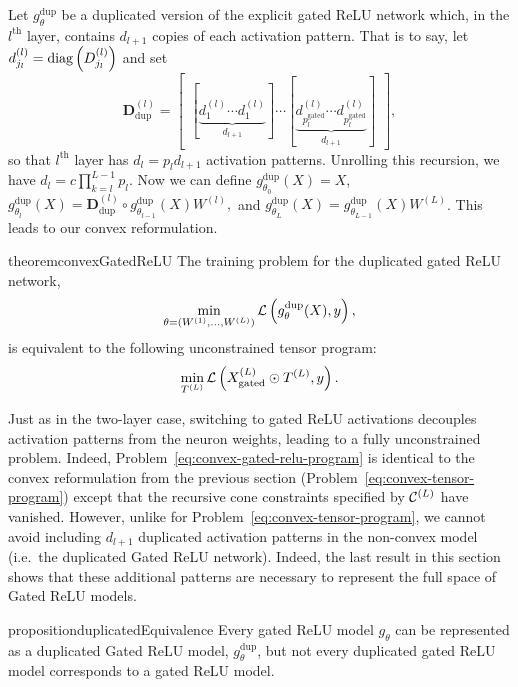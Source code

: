 Let \( g^{\text{dup}}_{\theta} \) be a duplicated version of the explicit
gated ReLU network which, in the \( l^{\text{th}} \) layer, contains
\( d_{l+1} \) copies of each activation pattern.
That is to say, let \( d^{(l)}_{j_l} = \text{diag}\left(D^{(l)}_{j_l}\right) \)
and set
\[
    \mathbf{D}^{(l)}_{\text{dup}} =
    \begin{bmatrix}
        [\underbrace{d^{(l)}_{1} \cdots d^{(l)}_{1}}_{d_{l+1}}] \cdots
        [\underbrace{d^{(l)}_{p_l^{\text{gated}}} \cdots d^{(l)}_{p_l^{\text{gated}}}}_{d_{l+1}}]
    \end{bmatrix},
\]
so that \( l^{\text{th}} \) layer has \( d_l = p_l d_{l+1} \) activation
patterns.
Unrolling this recursion, we have \( d_l = c \prod_{k = l}^{L-1} p_l \).
Now we can define \( g_{\theta_0}^{\text{dup}}(X) = X \),
\( g^{\text{dup}}_{\theta_{l}}(X)
= \mathbf{D}_{\text{dup}}^{(l)} \circ g^{\text{dup}}_{\theta_{l-1}}(X) W^{(l)}, \)
and \( g_{\theta_L}^{\text{dup}}(X) = g^{\text{dup}}_{\theta_{L-1}}(X) W^{(L)} \).
This leads to our convex reformulation.
\begin{restatable}{theorem}{convexGatedReLU}\label{thm:convex-gated-relu}
    The training problem for the duplicated gated ReLU network,
    \begin{equation}\label{eq:duplicated-gated-relu-program}
        \min_{\theta = (W^{(1)}, \ldots, W^{(L)})} \mathcal{L}\left(g^{\text{dup}}_{\theta}(X), y\right),
    \end{equation}
    is equivalent to the following unconstrained tensor program:
    \begin{equation}\label{eq:convex-gated-relu-program}
        \min_{T^{(L)}} \mathcal{L}\left(X^{(L)}_{\text{gated}} \odot T^{(L)}, y\right).
    \end{equation}
\end{restatable}
Just as in the two-layer case, switching to gated ReLU activations decouples
activation patterns from the neuron weights, leading to a fully unconstrained
problem.
Indeed, Problem~\ref{eq:convex-gated-relu-program} is
identical to the convex reformulation from the previous section
(Problem~\ref{eq:convex-tensor-program}) except that the recursive cone
constraints specified by \( \mathcal{C}^{(L)} \) have vanished.
However, unlike for Problem~\ref{eq:convex-tensor-program}, we cannot
avoid including \( d_{l+1} \) duplicated activation patterns in the non-convex
model (i.e.\ the duplicated Gated ReLU network).
Indeed, the last result in this section shows that these additional
patterns are necessary to represent the full space of Gated ReLU models.

\begin{restatable}{proposition}{duplicatedEquivalence}%
    \label{prop:duplicated-equivalence}
    Every gated ReLU model \( g_\theta \) can be represented as a duplicated
    Gated ReLU model, \( g_\theta^{\text{dup}} \), but not every
    duplicated gated ReLU model corresponds to a gated ReLU model.
\end{restatable}

